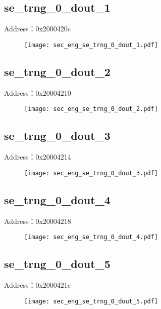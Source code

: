 \subsection{se\_trng\_0\_dout\_1}
\label{sec_eng-se-trng-0-dout-1}
Address：0x2000420c
 \begin{figure}[H]
\texttt{[image: sec\_eng\_se\_trng\_0\_dout\_1.pdf]}
\end{figure}

\subsection{se\_trng\_0\_dout\_2}
\label{sec_eng-se-trng-0-dout-2}
Address：0x20004210
 \begin{figure}[H]
\texttt{[image: sec\_eng\_se\_trng\_0\_dout\_2.pdf]}
\end{figure}

\subsection{se\_trng\_0\_dout\_3}
\label{sec_eng-se-trng-0-dout-3}
Address：0x20004214
 \begin{figure}[H]
\texttt{[image: sec\_eng\_se\_trng\_0\_dout\_3.pdf]}
\end{figure}

\subsection{se\_trng\_0\_dout\_4}
\label{sec_eng-se-trng-0-dout-4}
Address：0x20004218
 \begin{figure}[H]
\texttt{[image: sec\_eng\_se\_trng\_0\_dout\_4.pdf]}
\end{figure}

\subsection{se\_trng\_0\_dout\_5}
\label{sec_eng-se-trng-0-dout-5}
Address：0x2000421c
 \begin{figure}[H]
\texttt{[image: sec\_eng\_se\_trng\_0\_dout\_5.pdf]}
\end{figure}

